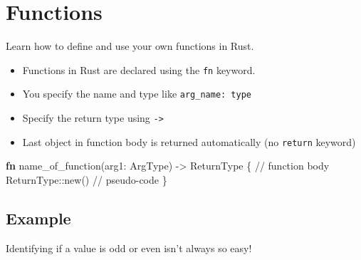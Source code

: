 \documentclass[
  letterpaper,
  DIV=11,
  numbers=noendperiod,
  oneside]{scrreprt}
\newenvironment{Shaded}{\begin{snugshade}}{\end{snugshade}}
\newcommand{\CommentTok}[1]{\textcolor[rgb]{0.37,0.37,0.37}{#1}}
\newcommand{\KeywordTok}[1]{\textcolor[rgb]{0.00,0.23,0.31}{\textbf{#1}}}
\newcommand{\NormalTok}[1]{\textcolor[rgb]{0.00,0.23,0.31}{#1}}
\newcommand{\OperatorTok}[1]{\textcolor[rgb]{0.37,0.37,0.37}{#1}}
\newcommand{\PreprocessorTok}[1]{\textcolor[rgb]{0.68,0.00,0.00}{#1}}
\providecommand{\tightlist}{%
  \setlength{\itemsep}{0pt}\setlength{\parskip}{0pt}}\usepackage{longtable,booktabs,array}
\begin{document}
\chapter{Functions}\label{functions}

\begin{tcolorbox}[enhanced jigsaw, titlerule=0mm, coltitle=black, opacitybacktitle=0.6, bottomrule=.15mm, bottomtitle=1mm, colframe=quarto-callout-tip-color-frame, toprule=.15mm, opacityback=0, rightrule=.15mm, leftrule=.75mm, breakable, left=2mm, colback=white, colbacktitle=quarto-callout-tip-color!10!white, toptitle=1mm, title=\textcolor{quarto-callout-tip-color}{\faLightbulb}\hspace{0.5em}{Tip}, arc=.35mm]

Learn how to define and use your own functions in Rust.

\end{tcolorbox}

\begin{itemize}
\tightlist
\item
  Functions in Rust are declared using the \texttt{fn} keyword.
\item
  You specify the name and type like \texttt{arg\_name:\ type}
\item
  Specify the return type using \texttt{-\textgreater{}}
\item
  Last object in function body is returned automatically (no
  \texttt{return} keyword)
\end{itemize}

\begin{Shaded}
\begin{Highlighting}[]
\KeywordTok{fn}\NormalTok{ name\_of\_function(arg1}\OperatorTok{:}\NormalTok{ ArgType) }\OperatorTok{{-}\textgreater{}}\NormalTok{ ReturnType }\OperatorTok{\{}
    \CommentTok{// function body}
    \PreprocessorTok{ReturnType::}\NormalTok{new() }\CommentTok{// pseudo{-}code}
\OperatorTok{\}}
\end{Highlighting}
\end{Shaded}

\section{Example}\label{example}

Identifying if a value is odd or even isn't always so easy!
\end{document}
